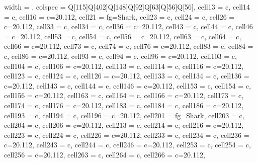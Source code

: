 \documentclass{article}
\newcommand\Fontvi{\fontsize{7}{7}\selectfont}
\begin{document}
{\Fontvi
\begin{longtblr}[
  caption = {Survey responses for confirmed time series (6 responses), wastewater (5 responses), deaths (XX responses), and transmission pairs (XX responses).},
  label = {tab:placeholder_label},
]{
  width = \linewidth,
  colspec = {Q[115]Q[402]Q[148]Q[92]Q[63]Q[56]Q[56]},
  cell{1}{3} = {c},
  cell{1}{4} = {c},
  cell{1}{6} = {c=2}{0.112\linewidth},
  cell{2}{1} = {fg=Shark},
  cell{2}{3} = {c},
  cell{2}{4} = {c},
  cell{2}{6} = {c=2}{0.112\linewidth},
  cell{3}{3} = {c},
  cell{3}{4} = {c},
  cell{3}{6} = {c=2}{0.112\linewidth},
  cell{4}{3} = {c},
  cell{4}{4} = {c},
  cell{4}{6} = {c=2}{0.112\linewidth},
  cell{5}{3} = {c},
  cell{5}{4} = {c},
  cell{5}{6} = {c=2}{0.112\linewidth},
  cell{6}{3} = {c},
  cell{6}{4} = {c},
  cell{6}{6} = {c=2}{0.112\linewidth},
  cell{7}{3} = {c},
  cell{7}{4} = {c},
  cell{7}{6} = {c=2}{0.112\linewidth},
  cell{8}{3} = {c},
  cell{8}{4} = {c},
  cell{8}{6} = {c=2}{0.112\linewidth},
  cell{9}{3} = {c},
  cell{9}{4} = {c},
  cell{9}{6} = {c=2}{0.112\linewidth},
  cell{10}{3} = {c},
  cell{10}{4} = {c},
  cell{10}{6} = {c=2}{0.112\linewidth},
  cell{11}{3} = {c},
  cell{11}{4} = {c},
  cell{11}{6} = {c=2}{0.112\linewidth},
  cell{12}{3} = {c},
  cell{12}{4} = {c},
  cell{12}{6} = {c=2}{0.112\linewidth},
  cell{13}{3} = {c},
  cell{13}{4} = {c},
  cell{13}{6} = {c=2}{0.112\linewidth},
  cell{14}{3} = {c},
  cell{14}{4} = {c},
  cell{14}{6} = {c=2}{0.112\linewidth},
  cell{15}{3} = {c},
  cell{15}{4} = {c},
  cell{15}{6} = {c=2}{0.112\linewidth},
  cell{16}{3} = {c},
  cell{16}{4} = {c},
  cell{16}{6} = {c=2}{0.112\linewidth},
  cell{17}{3} = {c},
  cell{17}{4} = {c},
  cell{17}{6} = {c=2}{0.112\linewidth},
  cell{18}{3} = {c},
  cell{18}{4} = {c},
  cell{18}{6} = {c=2}{0.112\linewidth},
  cell{19}{3} = {c},
  cell{19}{4} = {c},
  cell{19}{6} = {c=2}{0.112\linewidth},
  cell{20}{1} = {fg=Shark},
  cell{20}{3} = {c},
  cell{20}{4} = {c},
  cell{20}{6} = {c=2}{0.112\linewidth},
  cell{21}{3} = {c},
  cell{21}{4} = {c},
  cell{21}{6} = {c=2}{0.112\linewidth},
  cell{22}{3} = {c},
  cell{22}{4} = {c},
  cell{22}{6} = {c=2}{0.112\linewidth},
  cell{23}{3} = {c},
  cell{23}{4} = {c},
  cell{23}{6} = {c=2}{0.112\linewidth},
  cell{24}{3} = {c},
  cell{24}{4} = {c},
  cell{24}{6} = {c=2}{0.112\linewidth},
  cell{25}{3} = {c},
  cell{25}{4} = {c},
  cell{25}{6} = {c=2}{0.112\linewidth},
  cell{26}{3} = {c},
  cell{26}{4} = {c},
  cell{26}{6} = {c=2}{0.112\linewidth},
}
\end{longtblr}}
\end{document}
